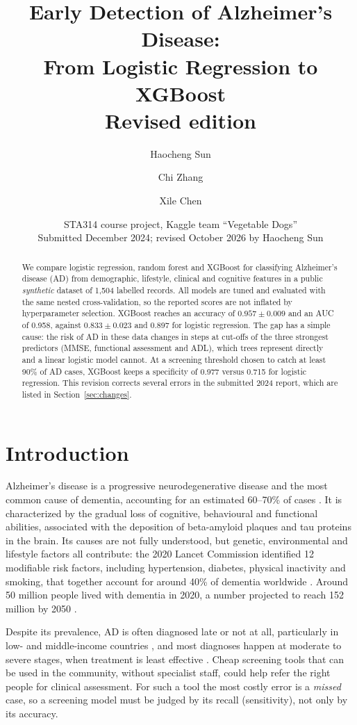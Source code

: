 \documentclass[11pt]{article}
\title{Early Detection of Alzheimer's Disease:\\From Logistic Regression to XGBoost\\[4pt]\large Revised edition}
\author{Haocheng Sun \and Chi Zhang \and Xile Chen}
\date{STA314 course project, Kaggle team ``Vegetable Dogs''\\
Submitted December 2024; revised October 2026 by Haocheng Sun}
\begin{document}
\maketitle

\begin{abstract}
We compare logistic regression, random forest and XGBoost for classifying Alzheimer's disease (AD)
from demographic, lifestyle, clinical and cognitive features in a public \emph{synthetic} dataset of
1,504 labelled records. All models are tuned and evaluated with the same nested cross-validation, so
the reported scores are not inflated by hyperparameter selection. XGBoost reaches an accuracy of
$0.957 \pm 0.009$ and an AUC of 0.958, against $0.833 \pm 0.023$ and 0.897 for logistic regression.
The gap has a simple cause: the risk of AD in these data changes in steps at cut-offs of the three
strongest predictors (MMSE, functional assessment and ADL), which trees represent directly and a linear
logistic model cannot. At a screening threshold chosen to catch at least 90\% of AD cases, XGBoost keeps
a specificity of 0.977 versus 0.715 for logistic regression. This revision corrects
several errors in the submitted 2024 report, which are listed in Section~\ref{sec:changes}.
\end{abstract}

\section{Introduction}

Alzheimer's disease is a progressive neurodegenerative disease and the most common cause of dementia,
accounting for an estimated 60--70\% of cases \citep{rosselli2022culture}. It is characterized by the
gradual loss of cognitive, behavioural and functional abilities, associated with the deposition of
beta-amyloid plaques and tau proteins in the brain. Its causes are not fully understood, but genetic,
environmental and lifestyle factors all contribute: the 2020 Lancet Commission identified 12 modifiable
risk factors, including hypertension, diabetes, physical inactivity and smoking, that together account
for around 40\% of dementia worldwide \citep{livingston2020dementia}. Around 50 million people lived with
dementia in 2020, a number projected to reach 152 million by 2050 \citep{livingston2020dementia}.

Despite its prevalence, AD is often diagnosed late or not at all, particularly in low- and
middle-income countries \citep{lazarova2023detection}, and most diagnoses happen at moderate to severe
stages, when treatment is least effective \citep{li2024intelligentdiagnosisalzheimersdisease}. Cheap
screening tools that can be used in the community, without specialist staff, could help refer the right
people for clinical assessment. For such a tool the most costly error is a \emph{missed} case, so a
screening model must be judged by its recall (sensitivity), not only by its accuracy.
\end{document}
